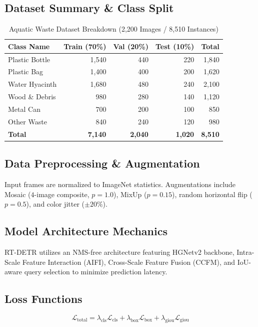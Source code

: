 \documentclass[10pt,journal,compsoc]{IEEEtran}
\begin{document}
\subsection{Dataset Summary \& Class Split}
\begin{table}[htbp]
\caption{Aquatic Waste Dataset Breakdown (2,200 Images / 8,510 Instances)}
\centering
\begin{tabular}{lrrrr}
\toprule
\textbf{Class Name} & \textbf{Train (70\%)} & \textbf{Val (20\%)} & \textbf{Test (10\%)} & \textbf{Total} \\
\midrule
Plastic Bottle & 1,540 & 440 & 220 & 1,840 \\
Plastic Bag & 1,400 & 400 & 200 & 1,620 \\
Water Hyacinth & 1,680 & 480 & 240 & 2,100 \\
Wood \& Debris & 980 & 280 & 140 & 1,120 \\
Metal Can & 700 & 200 & 100 & 850 \\
Other Waste & 840 & 240 & 120 & 980 \\
\midrule
\textbf{Total} & \textbf{7,140} & \textbf{2,040} & \textbf{1,020} & \textbf{8,510} \\
\bottomrule
\end{tabular}
\end{table}

\subsection{Data Preprocessing \& Augmentation}
Input frames are normalized to ImageNet statistics. Augmentations include Mosaic ($4$-image composite, $p=1.0$), MixUp ($p=0.15$), random horizontal flip ($p=0.5$), and color jitter ($\pm 20\%$).

\subsection{Model Architecture Mechanics}
RT-DETR utilizes an NMS-free architecture featuring HGNetv2 backbone, Intra-Scale Feature Interaction (AIFI), Cross-Scale Feature Fusion (CCFM), and IoU-aware query selection to minimize prediction latency.

\subsection{Loss Functions}
\begin{equation}
\mathcal{L}_{\text{total}} = \lambda_{\text{cls}} \mathcal{L}_{\text{cls}} + \lambda_{\text{box}} \mathcal{L}_{\text{box}} + \lambda_{\text{giou}} \mathcal{L}_{\text{giou}}
\end{equation}
\end{document}
